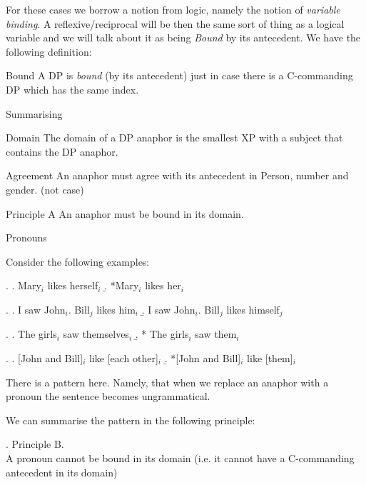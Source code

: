 \begin{frame}
  For these cases we borrow a notion from logic, namely the notion of \textit{variable binding}.  A reflexive/reciprocal will be then the same sort of thing as a logical variable and we will talk about it as being \textit{Bound} by its antecedent.  We have the following definition:


  \begin{block}
    {Bound}
    A DP is \textit{bound} (by its antecedent) just in case there is a C-commanding DP which has the same index.
  \end{block}

\end{frame}


\begin{frame}
{Summarising}
\begin{block}
  {Domain}
The domain of a DP anaphor is the smallest XP with a subject that contains the DP anaphor.
\end{block}
\begin{block}
  {Agreement}
An anaphor must agree with its antecedent in Person, number and gender. (not case)
\end{block}
\begin{block}
  {Principle A}
An anaphor must be bound in its domain.
\end{block}
  
\end{frame}

\begin{frame}
  {Pronouns}

Consider the following examples:

\ex.
\a. Mary$_i$ likes herself$_i$
\b. *Mary$_i$ likes her$_i$


\ex.
\a. I saw John$_i$.  Bill$_j$ likes him$_i$
\b. I saw John$_i$.  Bill$_j$ likes himself$_j$


\ex.
\a. The girls$_i$ saw themselves$_i$
\b. * The girls$_i$ saw them$_i$


\ex.
\a. [John and Bill]$_i$ like [each other]$_i$ 
\b. *[John and Bill]$_i$ like [them]$_i$ 


\end{frame}


\begin{frame}
  There is a pattern here.   Namely, that when we replace an anaphor with a pronoun the sentence becomes ungrammatical.
\end{frame}


\begin{frame}
  We can summarise the pattern in the following principle:


\ex. 
Principle B.\\
A pronoun cannot be bound in its domain (i.e. it cannot have a C-commanding antecedent in its domain)

\end{frame}

